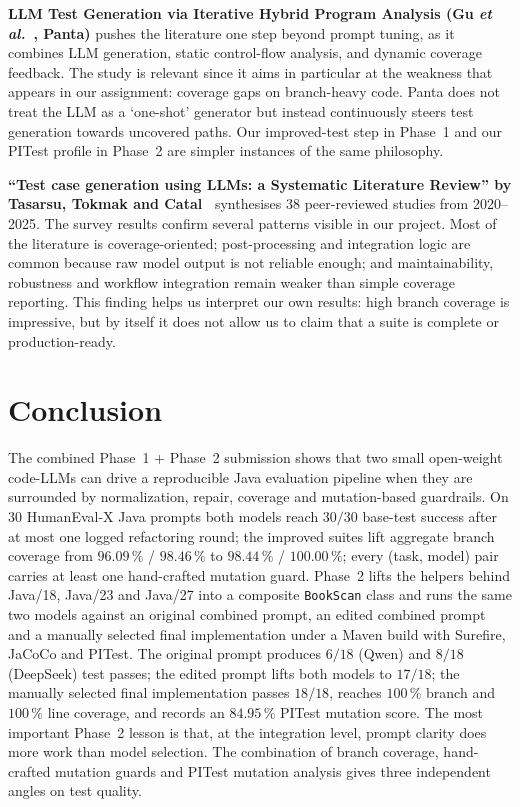 \documentclass[journal]{IEEEtran}
\begin{document}
\textbf{LLM Test Generation via Iterative Hybrid Program Analysis (Gu
\emph{et al.}~\cite{panta2024}, Panta)} pushes the literature one step
beyond prompt tuning, as it combines LLM generation, static control-flow
analysis, and dynamic coverage feedback. The study is relevant since it
aims in particular at the weakness that appears in our assignment:
coverage gaps on branch-heavy code. Panta does not treat the LLM as a
`one-shot' generator but instead continuously steers test generation
towards uncovered paths. Our improved-test step in Phase~1 and our
PITest profile in Phase~2 are simpler instances of the same philosophy.

\textbf{``Test case generation using LLMs: a Systematic Literature
Review'' by Tasarsu, Tokmak and Catal~\cite{lit_review}} synthesises 38
peer-reviewed studies from 2020--2025. The survey results confirm
several patterns visible in our project. Most of the literature is
coverage-oriented; post-processing and integration logic are common
because raw model output is not reliable enough; and maintainability,
robustness and workflow integration remain weaker than simple coverage
reporting. This finding helps us interpret our own results: high branch
coverage is impressive, but by itself it does not allow us to claim that
a suite is complete or production-ready.

\section{Conclusion}\label{sec:conclusion}

The combined Phase~1 + Phase~2 submission shows that two small open-weight
code-LLMs can drive a reproducible Java evaluation pipeline when they are
surrounded by normalization, repair, coverage and mutation-based
guardrails. On 30 HumanEval-X Java prompts both models reach $30/30$
base-test success after at most one logged refactoring round; the
improved suites lift aggregate branch coverage from $96.09\,\%$ /
$98.46\,\%$ to $98.44\,\%$ / $100.00\,\%$; every (task, model) pair
carries at least one hand-crafted mutation guard. Phase~2 lifts the
helpers behind Java/18, Java/23 and Java/27 into a composite
\texttt{BookScan} class and runs the same two models against an original
combined prompt, an edited combined prompt and a manually selected final
implementation under a Maven build with Surefire, JaCoCo and PITest.
The original prompt produces $6/18$ (Qwen) and $8/18$ (DeepSeek) test
passes; the edited prompt lifts both models to $17/18$; the manually
selected final implementation passes $18/18$, reaches $100\,\%$ branch
and $100\,\%$ line coverage, and records an $84.95\,\%$ PITest mutation
score. The most important Phase~2 lesson is that, at the integration
level, prompt clarity does more work than model selection. The
combination of branch coverage, hand-crafted mutation guards and
PITest mutation analysis gives three independent angles on test quality.
\end{document}
